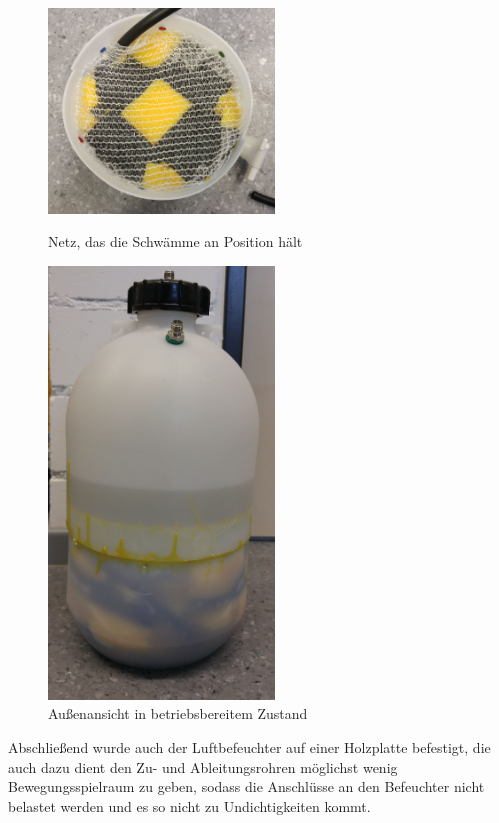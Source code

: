 \begin{figure}[h!]
	\begin{minipage}[hbt]{6cm}
		\centering
		\includegraphics[width=6cm]{Luftbefeuchter_Netz.jpg}
		\caption[Netz Luftbefeuchter]{Netz, das die Schwämme an Position hält}
	\end{minipage}
	\hfill
	\begin{minipage}[hbt]{6cm}
		\centering
		\includegraphics[width=6cm]{Luftbefeuchter_gesamt.jpg}
		\caption[Außenansicht Luftbefeuchter]{Außenansicht in betriebsbereitem Zustand}
	\end{minipage}
\end{figure}

\clearpage

Abschließend wurde auch der Luftbefeuchter auf einer Holzplatte befestigt, die auch dazu dient den Zu- und Ableitungsrohren möglichst wenig Bewegungsspielraum zu geben, sodass die Anschlüsse an den Befeuchter nicht belastet werden und es so nicht zu Undichtigkeiten kommt.


